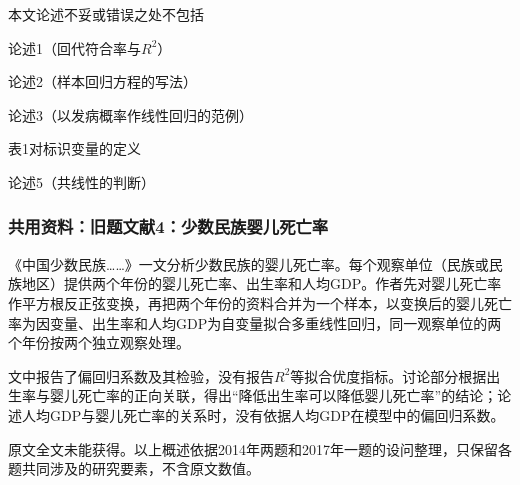 \par\addvspace{6pt}\noindent\begin{minipage}{\linewidth}


本文论述不妥或错误之处不包括

\begin{choices}

\item 论述1（回代符合率与\(R^2\)）

\item 论述2（样本回归方程的写法）

\item 论述3（以发病概率作线性回归的范例）

\item 表1对标识变量的定义

\item 论述5（共线性的判断）

\end{choices}

\end{minipage}\par\vspace{4pt}

\subsubsection*{共用资料：旧题文献4：少数民族婴儿死亡率}

《中国少数民族\ldots\ldots》一文分析少数民族的婴儿死亡率。每个观察单位（民族或民族地区）提供两个年份的婴儿死亡率、出生率和人均GDP。作者先对婴儿死亡率作平方根反正弦变换，再把两个年份的资料合并为一个样本，以变换后的婴儿死亡率为因变量、出生率和人均GDP为自变量拟合多重线性回归，同一观察单位的两个年份按两个独立观察处理。

文中报告了偏回归系数及其检验，没有报告\(R^2\)等拟合优度指标。讨论部分根据出生率与婴儿死亡率的正向关联，得出``降低出生率可以降低婴儿死亡率''的结论；论述人均GDP与婴儿死亡率的关系时，没有依据人均GDP在模型中的偏回归系数。

原文全文未能获得。以上概述依据2014年两题和2017年一题的设问整理，只保留各题共同涉及的研究要素，不含原文数值。



